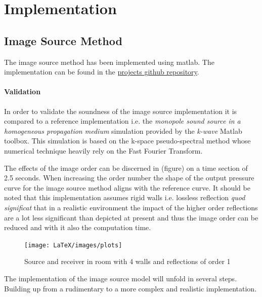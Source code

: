 \chapter{Implementation}
\label{chap:implementation}
\section{Image Source Method}
The image source method has been implemented using matlab. The implementation can be found in the \color{blue}\href{https://github.com/leonardberresheim/MA---Active-Noise-Control-in-Spatial-Domains/tree/main/Matlab/Image_Source_Method/ISM}{projects github repository}.\color{black}


\subsubsection{Validation}
In order to validate the soundness of the image source implementation it is compared to a reference implementation i.e. the \textit{monopole sound source in a homogeneous propagation medium} simulation provided by the \textit{k-wave} Matlab toolbox. This simulation is based on the k-space pseudo-spectral method whose numerical technique heavily rely on the Fast Fourier Transform.\cite{kwave}

The effects of the image order can be discerned in (figure) on a time section of 2.5 seconds. When increasing the order number the shape of the output pressure curve for the image source method aligns with the reference curve. It should be noted that this implementation assumes rigid walls i.e. lossless reflection \textit{quod significat} that in a realistic environment the impact of the higher order reflections are a lot less significant than depicted at present and thus the image order can be reduced and with it also the computation time.
\begin{figure}
    \centerline{\texttt{[image: LaTeX/images/plots]}}
    \caption{Source and receiver in room with 4 walls and reflections of order 1}
    \label{fig:ism_4_1_geo}
\end{figure}
\newpage
The implementation of the image source model will unfold in several steps. Building up from a rudimentary to a more complex and realistic implementation.
